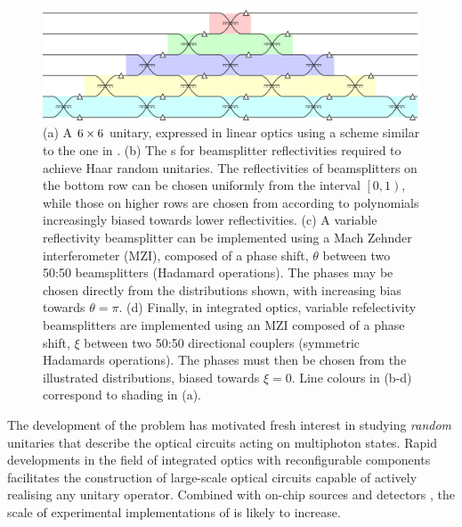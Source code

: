 \begin{figure}[t]
  \includegraphics{figures/example}
  \caption[A $6 \by 6$ unitary, expressed in linear optics]
    {(a) A \(6 \by 6\) unitary, expressed in linear optics using a scheme
    similar to the one in \cite{reck}. (b) The \pdf{}s for
    beamsplitter reflectivities required to achieve Haar random unitaries.
    The reflectivities of beamsplitters on the
    bottom row can be chosen uniformly from the interval \(\left[ 0,1 \right)\),
    while those on higher rows are chosen from according to polynomials
    increasingly biased towards lower reflectivities. (c) A variable
    reflectivity beamsplitter can be implemented using a Mach Zehnder
    interferometer (MZI), composed of a phase shift, \(\theta\) between two
    50:50 beamsplitters (Hadamard operations). The phases may be chosen directly
    from the distributions shown, with increasing bias towards \(\theta=\pi\).
    (d) Finally, in integrated optics, variable refelectivity beamsplitters are
    implemented using an MZI composed of a phase shift, \(\xi\) between two
    50:50 directional couplers (symmetric Hadamards operations). The phases must
    then be chosen from the illustrated distributions, biased towards \(\xi=0\).
    Line colours in (b-d) correspond to shading in (a).}
  \label{fig:example}
\end{figure}

The development of the \bosonsampling{} problem \cite{bosonsampling} has
motivated fresh interest in studying \emph{random} unitaries that describe the
optical circuits acting on multiphoton states. Rapid developments in the field
of integrated optics with reconfigurable components facilitates the construction
of large-scale optical circuits capable of actively realising any unitary
operator. Combined with on-chip sources \cite{sources-josh} and detectors
\cite{detectors-munich, detectors-yale}, the scale of experimental
implementations of \bosonsampling{} \cite{bs-rome, bs-brisbane, bs-oxford,
bs-vienna} is likely to increase.

